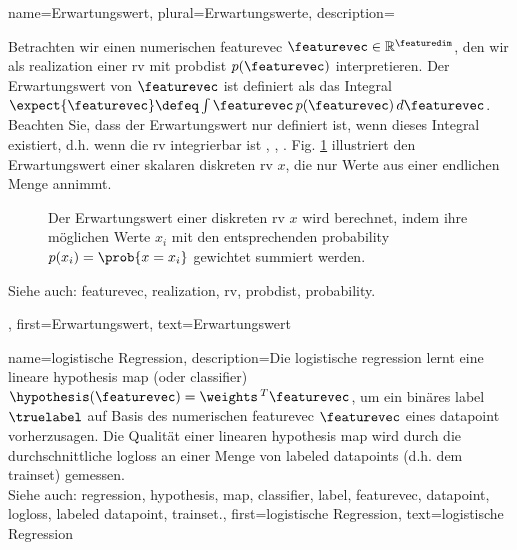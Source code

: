 {{{{
{name={Erwartungswert}, plural={Erwartungswerte},
  description={Betrachten wir einen numerischen \gls{featurevec} $\featurevec \in \mathbb{R}^{\featuredim}$, 
		den wir als \gls{realization} einer \gls{rv} mit \gls{probdist} $p(\featurevec)$ interpretieren. 
		Der Erwartungswert von $\featurevec$ ist definiert als das Integral 
		$\expect \{ \featurevec \} \defeq \int \featurevec \, p(\featurevec) \, d\featurevec$. 
		Beachten Sie, dass der Erwartungswert nur definiert ist, wenn dieses Integral existiert, d.h. wenn die \gls{rv} integrierbar ist 
		\cite{RudinBookPrinciplesMatheAnalysis}, \cite{BillingsleyProbMeasure}, \cite{HalmosMeasure}. 
		Fig. \ref{fig_expect_discrete_dict} illustriert den Erwartungswert einer skalaren diskreten \gls{rv} $x$, die nur Werte aus einer endlichen Menge annimmt. 
		\begin{figure}[H]
			\begin{center}
			\begin{tikzpicture}
			\end{tikzpicture}
			\end{center}
			\vspace*{-5mm}
			\caption{Der Erwartungswert einer diskreten \gls{rv} $x$ wird berechnet, indem ihre möglichen Werte $x_{i}$ mit den entsprechenden \gls{probability} $p(x_i) = \prob{x= x_i}$ gewichtet summiert werden. \label{fig_expect_discrete_dict}}
		\end{figure}
		Siehe auch: \gls{featurevec}, \gls{realization}, \gls{rv}, \gls{probdist}, \gls{probability}.},
	first={Erwartungswert},
	text={Erwartungswert}
}

{name={logistische Regression}, 
	description={Die logistische \gls{regression} lernt eine 
		lineare \gls{hypothesis} \gls{map} (oder \gls{classifier}) $\hypothesis(\featurevec) = \weights\,^{T} \featurevec$, 
		um ein binäres \gls{label} $\truelabel$ auf Basis des numerischen \gls{featurevec} $\featurevec$ eines \gls{datapoint} vorherzusagen. 
		Die Qualität einer linearen \gls{hypothesis} \gls{map} wird durch die durchschnittliche \gls{logloss} 
		an einer Menge von \glspl{labeled datapoint} (d.h. dem \gls{trainset}) gemessen.
		\\
		Siehe auch: \gls{regression}, \gls{hypothesis}, \gls{map}, \gls{classifier}, \gls{label}, \gls{featurevec}, \gls{datapoint}, \gls{logloss}, \gls{labeled datapoint}, \gls{trainset}.},
	first={logistische Regression},
	text={logistische Regression}
}

}}}}
